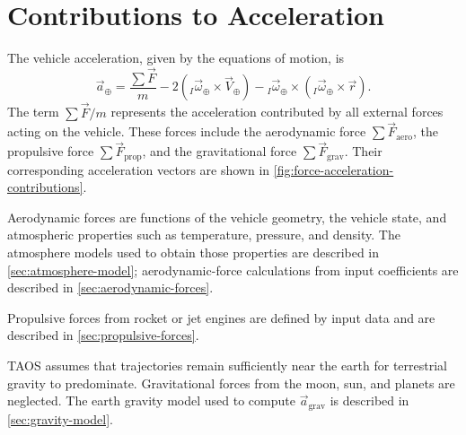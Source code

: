 \section{Contributions to Acceleration}\label{sec:acceleration-contributions}

The vehicle acceleration, given by the equations of motion, is
\begin{equation}
  \vec a_{\oplus}
  =\frac{\sum\vec F}{m}
   -2\left({}_{I}\vec\omega_{\oplus}\times\vec V_{\oplus}\right)
   -{}_{I}\vec\omega_{\oplus}\times
      \left({}_{I}\vec\omega_{\oplus}\times\vec r\right).
  \label{eq:acceleration-force-contributions}
\end{equation}
The term $\sum\vec F/m$ represents the acceleration contributed by all external
forces acting on the vehicle. These forces include the aerodynamic force
$\sum\vec F_{\mathrm{aero}}$, the propulsive force
$\sum\vec F_{\mathrm{prop}}$, and the gravitational force
$\sum\vec F_{\mathrm{grav}}$. Their corresponding acceleration vectors are shown
in \cref{fig:force-acceleration-contributions}.

\begin{center}
  \resizebox{0.83\linewidth}{!}{}
  {\captionsetup{hypcap=false}}
  \label{fig:force-acceleration-contributions}
\end{center}

Aerodynamic forces are functions of the vehicle geometry, the vehicle state, and
atmospheric properties such as temperature, pressure, and density. The atmosphere
models used to obtain those properties are described in
\cref{sec:atmosphere-model}; aerodynamic-force calculations from input
coefficients are described in \cref{sec:aerodynamic-forces}.

Propulsive forces from rocket or jet engines are defined by input data and are
described in \cref{sec:propulsive-forces}.

TAOS assumes that trajectories remain sufficiently near the earth for terrestrial
gravity to predominate. Gravitational forces from the moon, sun, and planets are
neglected. The earth gravity model used to compute
$\vec a_{\mathrm{grav}}$ is described in \cref{sec:gravity-model}.

